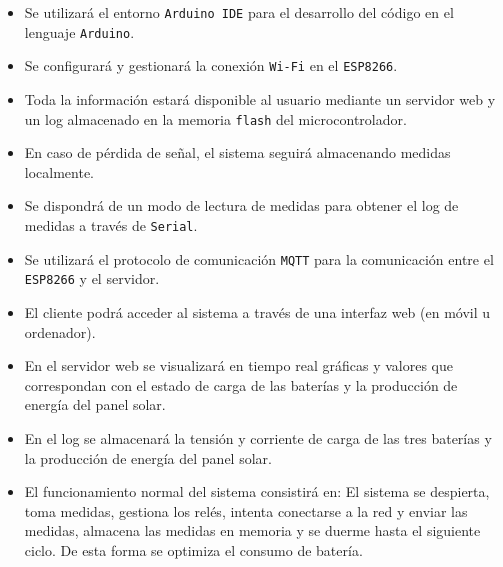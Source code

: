 \begin{itemize}
    \item Se utilizará el entorno \texttt{Arduino IDE} para el desarrollo del código en el lenguaje \texttt{Arduino}.
    \item Se configurará y gestionará la conexión \texttt{Wi-Fi} en el \texttt{ESP8266}.
    \item Toda la información estará disponible al usuario mediante un servidor web y un log almacenado en la memoria \texttt{flash} del microcontrolador.
    \item En caso de pérdida de señal, el sistema seguirá almacenando medidas localmente.
    \item Se dispondrá de un modo de lectura de medidas para obtener el log de medidas a través de \texttt{Serial}.
    \item Se utilizará el protocolo de comunicación \texttt{MQTT} para la comunicación entre el \texttt{ESP8266} y el servidor.
    \item El cliente podrá acceder al sistema a través de una interfaz web (en móvil u ordenador).
    \item En el servidor web se visualizará en tiempo real gráficas y valores que correspondan con el estado de carga de las baterías y la producción de energía del panel solar.
    \item En el log se almacenará la tensión y corriente de carga de las tres baterías y la producción de energía del panel solar.
    \item El funcionamiento normal del sistema consistirá en: El sistema se despierta, toma medidas, gestiona los relés, intenta conectarse a la red y enviar las medidas, almacena las medidas en memoria y se duerme hasta el siguiente ciclo. De esta forma se optimiza el consumo de batería.
\end{itemize}

